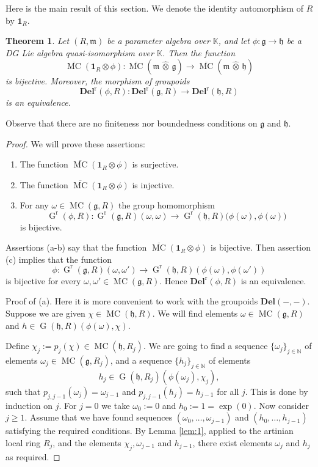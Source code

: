 \documentclass[a4paper,10pt]{amsart}
\newtheorem{thm}[equation]{Theorem}
\theoremstyle{definition}
\numberwithin{equation}{section}
\newcommand{\opn}{\operatorname}
\newcommand{\ol}{\overline}
\newcommand{\rmitem}[1]{\item[\text{\textup{(#1)}}]}
\newcommand{\mfrak}[1]{\mathfrak{#1}}
\newcommand{\mbf}[1]{\mathbf{#1}}
\newcommand{\mrm}[1]{\mathrm{#1}}
\newcommand{\mbb}[1]{\mathbb{#1}}
\newcommand{\bsym}[1]{\boldsymbol{#1}}
\newcommand{\what}[1]{\widehat{#1}}
\newcommand{\hatotimes}{\, \what{\otimes} \,}
\newcommand{\K}{\mbb{K}}
\newcommand{\N}{\mbb{N}}
\newcommand{\g}{\mfrak{g}}
\newcommand{\m}{\mfrak{m}}
\newcommand{\h}{\mfrak{h}}
\newcommand{\om}{\omega}
\begin{document}
Here is the main result of this section. We denote the identity automorphism of
$R$ by $\bsym{1}_R$.

\begin{thm} \label{thm:2}
Let $(R, \m)$ be a parameter algebra over $\K$, and let $\phi : \g \to \h$ be a
DG Lie algebra quasi-isomorphism over $\K$. Then the function 
\[ \ol{\opn{MC}}(\bsym{1}_R \otimes \phi) : \ol{\opn{MC}}(\m \hatotimes \g) \to
\ol{\opn{MC}}(\m \hatotimes \h)  \]
is bijective. Moreover, the morphism of groupoids
\[ \mbf{Del}^{\mrm{r}}(\phi, R) : \mbf{Del}^{\mrm{r}}(\g, R) 
\to \mbf{Del}^{\mrm{r}}(\h, R)  \]
is an equivalence. 
\end{thm}

Observe that there are no finiteness nor boundedness conditions on $\g$ and
$\h$. 

\begin{proof}
We will prove these assertions:
\begin{enumerate}
\rmitem{a} The function $\ol{\opn{MC}}(\bsym{1}_R \otimes \phi)$
is surjective.

\rmitem{b}  The function $\ol{\opn{MC}}(\bsym{1}_R \otimes \phi)$
is injective.

\rmitem{c} For any 
$\om \in \opn{MC}(\g, R)$ the group homomorphism 
\[ \opn{G}^{\mrm{r}}(\phi, R) : \opn{G}^{\mrm{r}}(\g, R)(\om, \om) \to 
\opn{G}^{\mrm{r}}(\h, R) \bigl( \phi(\om), \phi(\om) \bigr) \]
is bijective. 
\end{enumerate}

Assertions (a-b) say that the function
$\ol{\opn{MC}}(\bsym{1}_R \otimes \phi)$
is bijective. Then assertion (c) implies that the function 
\[ \phi :  \opn{G}^{\mrm{r}}(\g, R)(\om, \om') \to 
\opn{G}^{\mrm{r}}(\h, R)(\phi(\om), \phi(\om')) \]
is bijective for every $\om, \om' \in \opn{MC}(\g, R)$.
Hence $\mbf{Del}^{\mrm{r}}(\phi, R)$ is an equivalence.

\medskip \noindent
Proof of (a). Here it is more convenient to work with the groupoids
$\mbf{Del}(-, -)$. 
Suppose we are given $\chi \in \opn{MC}(\h, R)$. We will find 
elements $\om \in \opn{MC}(\g, R)$ and 
$h \in \opn{G}(\h, R)(\phi(\om), \chi)$. 

Define $\chi_j := p_j(\chi) \in \opn{MC}(\h, R_j)$.
We are going to find a sequence $\{ \om_j \}_{j \in \N}$ of elements
$\om_j \in \opn{MC}(\g, R_j)$, and a sequence $\{ h_j \}_{j \in \N}$ of
elements
\[ h_j \in  \opn{G}(\h, R_j)(\phi(\om_j), \chi_j) , \]
such that $p_{j, j-1}(\om_j) = \om_{j-1}$ and 
$p_{j, j-1}(h_j) = h_{j-1}$ for all $j$.
This is done by induction on $j$.
For $j = 0$ we take $\om_0 := 0$ and $h_0 := 1 = \exp(0)$. 
Now consider $j \geq 1$. Assume that we have found sequences 
$(\om_0, \ldots, \om_{j-1})$ and 
$(h_0, \ldots, h_{j-1})$ satisfying the required conditions. 
By Lemma \ref{lem:1}, applied to the artinian local ring $R_j$,
and the elements $\chi_j, \om_{j-1}$ and $h_{j-1}$, 
there exist elements $\om_j$ and $h_j$ as required. 


\end{proof}
\end{document}
